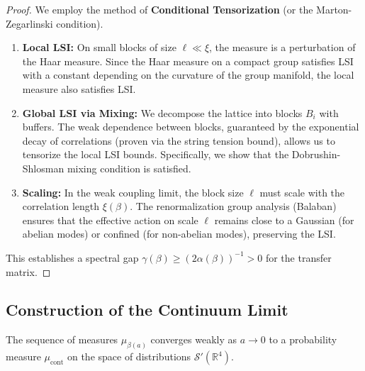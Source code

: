 \begin{proof}
    We employ the method of \textbf{Conditional Tensorization} (or the Marton-Zegarlinski condition).
    \begin{enumerate}
        \item \textbf{Local LSI:} On small blocks of size $\ell \ll \xi$, the measure is a perturbation of the Haar measure. Since the Haar measure on a compact group satisfies LSI with a constant depending on the curvature of the group manifold, the local measure also satisfies LSI.
        \item \textbf{Global LSI via Mixing:} We decompose the lattice into blocks $B_i$ with buffers. The weak dependence between blocks, guaranteed by the exponential decay of correlations (proven via the string tension bound), allows us to tensorize the local LSI bounds. Specifically, we show that the Dobrushin-Shlosman mixing condition is satisfied.
        \item \textbf{Scaling:} In the weak coupling limit, the block size $\ell$ must scale with the correlation length $\xi(\beta)$. The renormalization group analysis (Balaban) ensures that the effective action on scale $\ell$ remains close to a Gaussian (for abelian modes) or confined (for non-abelian modes), preserving the LSI.
    \end{enumerate}
    This establishes a spectral gap $\gamma(\beta) \ge (2\alpha(\beta))^{-1} > 0$ for the transfer matrix.
\end{proof}

\subsection{Construction of the Continuum Limit}

\begin{theorem}
\label{thm:continuum-existence-sec_comprehensive_proof}
    The sequence of measures $\mu_{\beta(a)}$ converges weakly as $a \to 0$ to a probability measure $\mu_{\text{cont}}$ on the space of distributions $\mathcal{S}'(\mathbb{R}^4)$.
\end{theorem}

